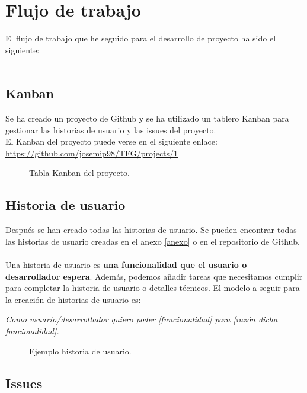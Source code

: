 \section{Flujo de trabajo} \label{sec:flujo_trabajo}

El flujo de trabajo que he seguido para el desarrollo de proyecto ha sido el siguiente:\\\\

\subsection{Kanban}

Se ha creado un proyecto de Github y se ha utilizado un tablero Kanban para gestionar las historias de usuario y las issues del proyecto.\\

El Kanban del proyecto puede verse en el siguiente enlace:
\url{https://github.com/josemip98/TFG/projects/1}

\begin{figure}[H]
  	\centering
  	\noindent{}
  	\caption{Tabla Kanban del proyecto.}
	\end{figure}

\subsection{Historia de usuario}

Después se han creado todas las historias de usuario.
Se pueden encontrar todas las historias de usuario creadas en el anexo \ref{anexo} o en el repositorio de Github\cite{user-stories}.\\\\
Una historia de usuario es \textbf{una funcionalidad que el usuario o desarrollador espera}.
Además, podemos añadir tareas que necesitamos cumplir para completar la historia de usuario o detalles técnicos.
El modelo a seguir para la creación de historias de usuario es:
 
\textit{Como usuario/desarrollador quiero poder [funcionalidad] para [razón dicha funcionalidad].}

\begin{figure}[H]
	\centering
	\noindent{}
	\caption{Ejemplo historia de usuario.}
  	\end{figure}

\subsection{Issues}


